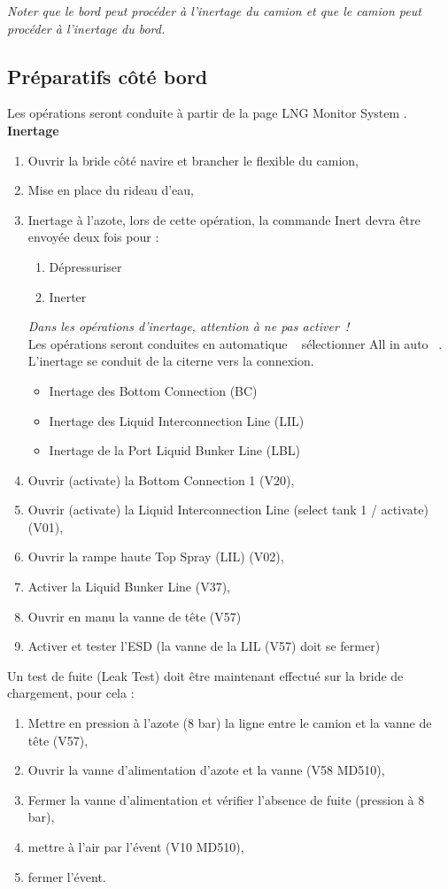 \documentclass[12pt,a4paper]{article}
\newcommand{\gui}[1]
{\og #1 \fg~}
\begin{document}
 \emph{Noter que le bord peut procéder à l'inertage du camion et que le camion peut procéder à l'inertage du bord.}
 \subsection*{Préparatifs côté bord}
Les opérations seront conduite à partir de la page \og LNG Monitor System \fg.
\\
\textbf{Inertage}
\begin{enumerate}
 \item Ouvrir la bride côté navire et brancher le flexible du camion,
 \item Mise en place du rideau d'eau,
 \item Inertage à l'azote, lors de cette opération, la commande Inert devra être envoyée deux fois pour :
 \begin{enumerate}
  \item Dépressuriser
  \item Inerter
 \end{enumerate}

    \emph{Dans les opérations d'inertage, attention à ne pas \og activer~\fg !}\\
Les opérations seront conduites en \gui{automatique} sélectionner \gui{All in auto}. L'inertage se conduit de la citerne vers la connexion.
    \begin{itemize}
        \item Inertage des Bottom Connection (BC)
        \item Inertage des Liquid Interconnection Line (LIL)
        \item Inertage de la Port Liquid Bunker Line (LBL)
    \end{itemize}
 \item Ouvrir (activate) la Bottom Connection 1 (V20),
 \item Ouvrir (activate) la Liquid Interconnection Line (select tank 1 / activate) (V01),
 \item Ouvrir la rampe haute Top Spray (LIL) (V02),
 \item Activer la Liquid Bunker Line (V37),
 \item Ouvrir en manu la vanne de tête (V57)
 \item Activer et tester l'ESD (la vanne de la LIL (V57)  doit se fermer)
\end{enumerate}
Un test de fuite (Leak Test) doit être maintenant effectué sur la bride de chargement, pour cela :\\
\begin{enumerate}
\item Mettre en pression à l'azote (8 bar) la ligne entre le camion et la vanne de tête (V57), 
 
 \item Ouvrir la vanne d'alimentation d'azote et la vanne (V58 MD510),
 \item Fermer la vanne d'alimentation et vérifier l'absence de fuite (pression à 8 bar),
 \item mettre à l'air par l'évent (V10 MD510),
 \item fermer l'évent.
\end{enumerate}
\end{document}
